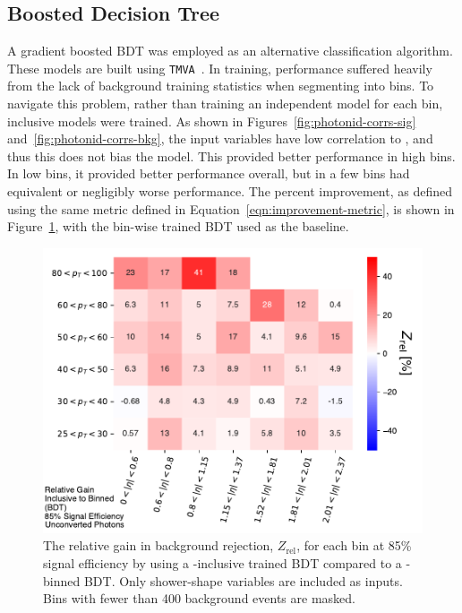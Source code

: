 \subsection{Boosted Decision Tree}\label{ssec:yid-bdt}

A gradient boosted \gls{BDT} was employed as an alternative classification algorithm. These models are built using \texttt{TMVA}~\cite{TMVA}. In training, performance suffered heavily from the lack of background training statistics when segmenting into \etaPt bins. To navigate this problem, rather than training an independent model for each \etaPt bin, \pt inclusive models were trained. As shown in Figures~\ref{fig:photonid-corrs-sig} and~\ref{fig:photonid-corrs-bkg}, the input variables have low correlation to \pt, and thus this does not bias the model. This provided better performance in high \pt bins. In low \pt bins, it provided better performance overall, but in a few bins had equivalent or negligibly worse performance. The percent improvement, as defined using the same metric defined in Equation~\ref{eqn:improvement-metric}, is shown in Figure~\ref{fig:bdtinclusive-vs-bdt}, with the bin-wise trained \gls{BDT} used as the baseline.

\begin{figure}[!htbp]
    \centering
    \includegraphics[width=.85\textwidth]{chapters/chapter4_photonID/images/BDTInclusive_v_BDT_normed.pdf}
    \caption[The relative gain in background rejection by using a \pt-inclusive trained \gls{BDT} compared to a \pt-binned \gls{BDT}]
    {The relative gain in background rejection, $Z_{\text{rel}}$, for each \etaPt bin at 85\% signal efficiency by using a \pt-inclusive trained \gls{BDT} compared to a \pt-binned \gls{BDT}. Only shower-shape variables are included as inputs. Bins with fewer than 400 background events are masked.}
    \label{fig:bdtinclusive-vs-bdt}
\end{figure}


